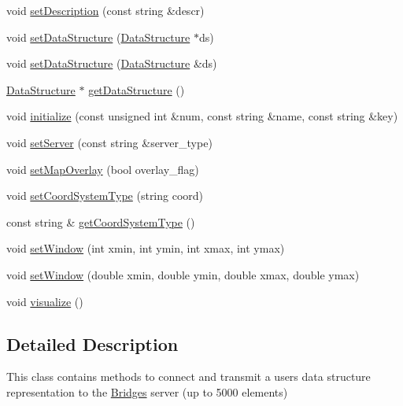 \begin{DoxyCompactItemize}
\item 
void \mbox{\hyperlink{classbridges_1_1_bridges_aa26285a4d04c2759113dcf233406a8da}{set\+Description}} (const string \&descr)
\item 
void \mbox{\hyperlink{classbridges_1_1_bridges_a7447e2d5808c492d26132690c1a639a7}{set\+Data\+Structure}} (\mbox{\hyperlink{classbridges_1_1_data_structure}{Data\+Structure}} $\ast$ds)
\item 
void \mbox{\hyperlink{classbridges_1_1_bridges_a40c30470565f76310b5a8aea80dcab3c}{set\+Data\+Structure}} (\mbox{\hyperlink{classbridges_1_1_data_structure}{Data\+Structure}} \&ds)
\item 
\mbox{\hyperlink{classbridges_1_1_data_structure}{Data\+Structure}} $\ast$ \mbox{\hyperlink{classbridges_1_1_bridges_a5ddfb17c2fb2d3ca89e7564677251dea}{get\+Data\+Structure}} ()
\item 
void \mbox{\hyperlink{classbridges_1_1_bridges_a10272250ed6f4bb8281dcaecc61fa698}{initialize}} (const unsigned int \&num, const string \&name, const string \&key)
\item 
void \mbox{\hyperlink{classbridges_1_1_bridges_afa05302cf91c91b902aef693525107a5}{set\+Server}} (const string \&server\+\_\+type)
\item 
void \mbox{\hyperlink{classbridges_1_1_bridges_a221442c674b625a403486076cf8a7c03}{set\+Map\+Overlay}} (bool overlay\+\_\+flag)
\item 
void \mbox{\hyperlink{classbridges_1_1_bridges_ad00c07d3a028110424909081a94c4013}{set\+Coord\+System\+Type}} (string coord)
\item 
const string \& \mbox{\hyperlink{classbridges_1_1_bridges_aac3cdb607177ff537f5160c3790d814a}{get\+Coord\+System\+Type}} ()
\item 
void \mbox{\hyperlink{classbridges_1_1_bridges_a4e4817085ea8147039a2be72792b6a6e}{set\+Window}} (int xmin, int ymin, int xmax, int ymax)
\item 
void \mbox{\hyperlink{classbridges_1_1_bridges_a2e8fd393ec46a2f80e9f8d8cc4cb0aa6}{set\+Window}} (double xmin, double ymin, double xmax, double ymax)
\item 
void \mbox{\hyperlink{classbridges_1_1_bridges_a2806e395134614cdd6327400b53d28ad}{visualize}} ()
\end{DoxyCompactItemize}


\subsection{Detailed Description}
This class contains methods to connect and transmit a user\textquotesingle{}s data structure representation to the \mbox{\hyperlink{classbridges_1_1_bridges}{Bridges}} server (up to 5000 elements) 


